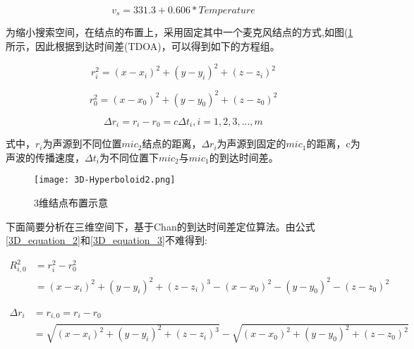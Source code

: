 \documentclass[winfonts]{njuthesis}
\begin{document}
		\begin{equation}
		   v_s = 331.3 + 0.606 * Temperature \label{v_speed}
		\end{equation}
		
		为缩小搜索空间，在结点的布置上，采用固定其中一个麦克风结点的方式,如图(\ref{fig: 3D-Hyperboloid2}所示，因此根据到达时间差(TDOA)，可以得到如下的方程组。
		
		\begin{equation}
			 r_i^2 = (x-x_i)^2 + (y-y_i)^2 + (z-z_i)^2 \label{3D_equation_2}
		\end{equation}
		
		\begin{equation}
			r_0^2 = (x-x_0)^2 + (y-y_0)^2 + (z-z_0)^2 \label{3D_equation_3}
		\end{equation}
		
		\begin{equation}
			\Delta r_i = r_i - r_0 = c\Delta t_i, i = 1,2,3,...,m \label{3D_equation_4}
		\end{equation}
		
		式中，$r_i$为声源到不同位置$mic_2$结点的距离，$\Delta r_i$为声源到固定的$mic_1$的距离，c为声波的传播速度，$\Delta t_i$为不同位置下$mic_2$与$mic_1$的到达时间差。
		
		\begin{figure}[H]
			\centering
			\texttt{[image: 3D-Hyperboloid2.png]} 
			\caption{3维结点布置示意}
			\label{fig: 3D-Hyperboloid2}
		\end{figure}
		
		下面简要分析在三维空间下，基于Chan的到达时间差定位算法\cite{Chan3DTDOA}。由公式\ref{3D_equation_2}和\ref{3D_equation_3}不难得到:
		
		\begin{equation}
		\begin{aligned}
			R_{i,0}^2 & = r_i^2 - r_0^2 \\
					  &	= (x-x_i)^2 + (y-y_i)^2 + (z-z_i)^3 - (x-x_0)^2 - (y-y_0)^2 - (z-z_0)^2
		\end{aligned}
		\end{equation}
		
		\begin{equation}
		\begin{aligned}
			\Delta r_i & = r_{i,0} = r_i - r_0\\	
			  		   & = \sqrt{(x-x_i)^2 + (y-y_i)^2 + (z-z_i)^3} - \sqrt{(x-x_0)^2 + (y-y_0)^2 + (z-z_0)^2}  
		\end{aligned}
		\end{equation}
		
\end{document}
